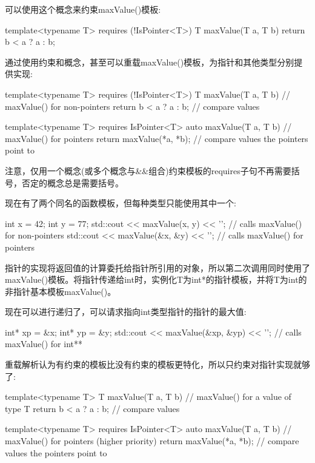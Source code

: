 可以使用这个概念来约束maxValue()模板:

\begin{cpp}
template<typename T>
requires (!IsPointer<T>)
T maxValue(T a, T b)
{
	return b < a ? a : b;
}
\end{cpp}


通过使用约束和概念，甚至可以重载maxValue()模板，为指针和其他类型分别提供实现:

\begin{cpp}
template<typename T>
requires (!IsPointer<T>)
T maxValue(T a, T b) // maxValue() for non-pointers
{
	return b < a ? a : b; // compare values
}

template<typename T>
requires IsPointer<T>
auto maxValue(T a, T b) // maxValue() for pointers
{
	return maxValue(*a, *b); // compare values the pointers point to
}
\end{cpp}

注意，仅用一个概念(或多个概念与\&\&组合)约束模板的requires子句不再需要括号，否定的概念总是需要括号。

现在有了两个同名的函数模板，但每种类型只能使用其中一个:

\begin{cpp}
int x = 42;
int y = 77;
std::cout << maxValue(x, y) << '\n'; // calls maxValue() for non-pointers
std::cout << maxValue(&x, &y) << '\n'; // calls maxValue() for pointers
\end{cpp}

指针的实现将返回值的计算委托给指针所引用的对象，所以第二次调用同时使用了maxValue()模板。将指针传递给int时，实例化T为int*的指针模板，并将T为int的非指针基本模板maxValue()。

现在可以进行递归了，可以请求指向int类型指针的指针的最大值:

\begin{cpp}
int* xp = &x;
int* yp = &y;
std::cout << maxValue(&xp, &yp) << '\n'; // calls maxValue() for int**
\end{cpp}


重载解析认为有约束的模板比没有约束的模板更特化，所以只约束对指针实现就够了:

\begin{cpp}
template<typename T>
T maxValue(T a, T b) // maxValue() for a value of type T
{
	return b < a ? a : b; // compare values
}

template<typename T>
requires IsPointer<T>
auto maxValue(T a, T b) // maxValue() for pointers (higher priority)
{
	return maxValue(*a, *b); // compare values the pointers point to
}
\end{cpp}

